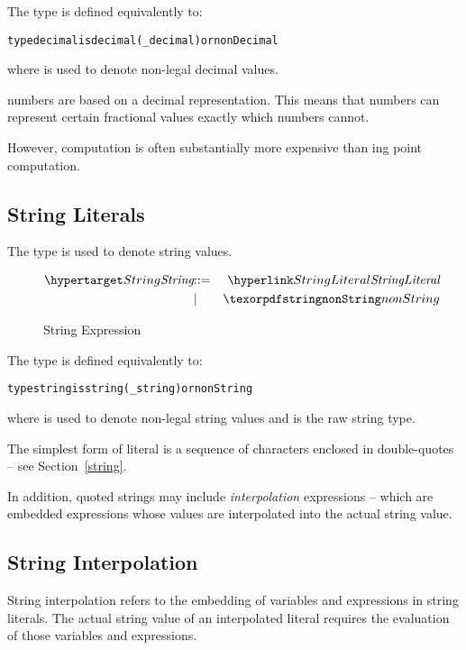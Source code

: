 The  type is defined equivalently to:
\begin{alltt}
type decimal is decimal(_decimal) or nonDecimal
\end{alltt}
where  is used to denote non-legal decimal values.

\begin{aside}
 numbers are based on a decimal representation. This means that  numbers can represent certain fractional values exactly which  numbers cannot.

However,  computation is often substantially more expensive than ing point computation.
\end{aside}

\subsection{String Literals}
\label{stringType}

The  type is used to denote string values.

\begin{figure}[htbp]
\begin{eqnarray*}
\ntDef{String}&\arrow&\ntRef{StringLiteral}\\
&\choice&\q{nonString}\\
\end{eqnarray*}
\caption{String Expression}\label{stringInterpolationFig}
\end{figure}

The  type is defined equivalently to:
\begin{alltt}
type string is string(_string) or nonString
\end{alltt}
where  is used to denote non-legal string values and  is the raw string type.

The simplest form of  literal is a sequence of characters enclosed in double-quotes -- see Section~\vref{string}.

In addition, quoted strings may include \emph{interpolation} expressions -- which are embedded expressions whose values are interpolated into the actual string value.

\subsection{String Interpolation}
\label{StringInterpolation}
String interpolation refers to the embedding of variables and expressions in string literals. The actual string value of an interpolated  literal requires the evaluation of those variables and expressions.

